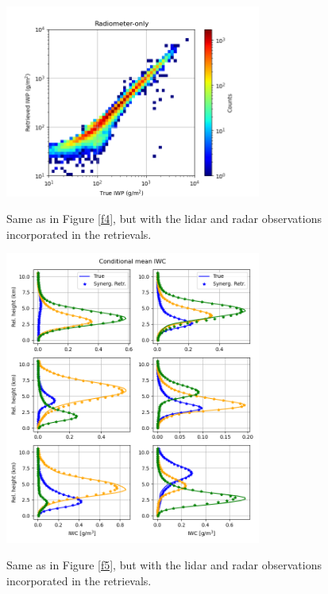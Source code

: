 \documentclass{ametsocV6.1}
\begin{document}
\begin{figure}[t]
    \centering
    \includegraphics[width=0.75\textwidth,angle=0]{./Figs/fig07.png}\\
    \caption{Same as in Figure \ref{f4}, but with the lidar and radar observations incorporated in the
    retrievals.}\label{f7}
\end{figure}

\begin{figure}[t]
    \centering
    \includegraphics[width=0.75\textwidth,angle=0]{./Figs/fig08.png}\\
    \caption{Same as in Figure \ref{f5}, but with the lidar and radar observations incorporated in the
    retrievals.}\label{f8}
\end{figure}
\end{document}
